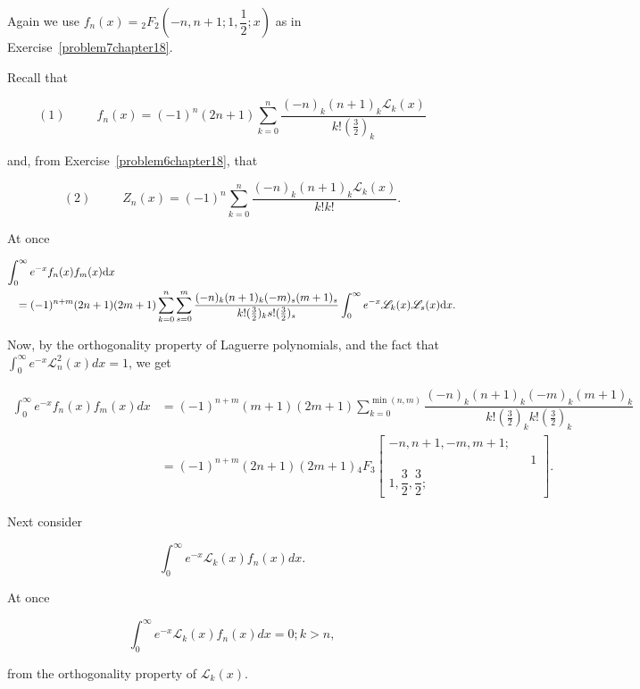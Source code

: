 \begin{solution}
Again we use $f_n(x) = {}_2F_2 \left( -n, n+1; 1, \dfrac{1}{2};x \right)$ as in Exercise~\ref{problem7chapter18}.

Recall that

$$(1) \hspace{30pt} f_n(x) = (-1)^n (2n+1) \displaystyle\sum_{k=0}^n \dfrac{(-n)_k (n+1)_k \mathscr{L}_k(x)}{k! (\frac{3}{2})_k}$$

and, from Exercise~\ref{problem6chapter18}, that

$$(2) \hspace{30pt} Z_n(x) = (-1)^n \displaystyle\sum_{k=0}^n \dfrac{(-n)_k (n+1)_k \mathscr{L}_k(x)}{k! k!}.$$

At once

\begin{eqnarray*}
\lefteqn{\displaystyle\int_0^{\infty} e^{-x} f_n(x) f_m(x) \mathrm{d}x}\\
&& = (-1)^{n+m} (2n+1)(2m+1) \displaystyle\sum_{k=0}^n \displaystyle\sum_{s=0}^m \dfrac{(-n)_k (n+1)_k (-m)_s (m+1)_s}{k! (\frac{3}{2})_k s! (\frac{3}{2})_s} \displaystyle\int_0^{\infty} e^{-x} \mathscr{L}_k(x) \mathscr{L}_s(x) \mathrm{d}x.
\end{eqnarray*}

Now, by the orthogonality property of Laguerre polynomials, and the fact that $\displaystyle\int_0^{\infty} e^{-x} \mathscr{L}_n^2(x) dx =1$, we get

$$\begin{array}{ll}
\displaystyle\int_0^{\infty} e^{-x} f_n(x) f_m(x) dx &= (-1)^{n+m} (m+1)(2m+1) \displaystyle\sum_{k=0}^{\min(n,m)} \dfrac{(-n)_k (n+1)_k (-m)_k (m+1)_k}{k! (\frac{3}{2})_k k! (\frac{3}{2})_k} \\
&= (-1)^{n+m} (2n+1)(2m+1) {}_4F_3 \left[ \begin{array}{rlr}
-n, n+1, -m, m+1; & & \\
& & 1 \\
1, \dfrac{3}{2}, \dfrac{3}{2}; & & 
\end{array} \right].
\end{array}$$

Next consider 

$$\displaystyle\int_0^{\infty} e^{-x} \mathscr{L}_k(x) f_n(x) dx.$$

At once

$$\displaystyle\int_0^{\infty} e^{-x} \mathscr{L}_k(x) f_n(x) dx = 0; k>n,$$

from the orthogonality property of $\mathscr{L}_k(x)$.


\end{solution}
